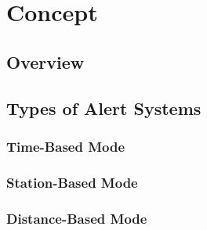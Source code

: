 \chapter{Concept}
\label{cha:Concept}

\section{Overview}

\section{Types of Alert Systems}
\subsection{Time-Based Mode}

\subsection{Station-Based Mode}

\subsection{Distance-Based Mode}



